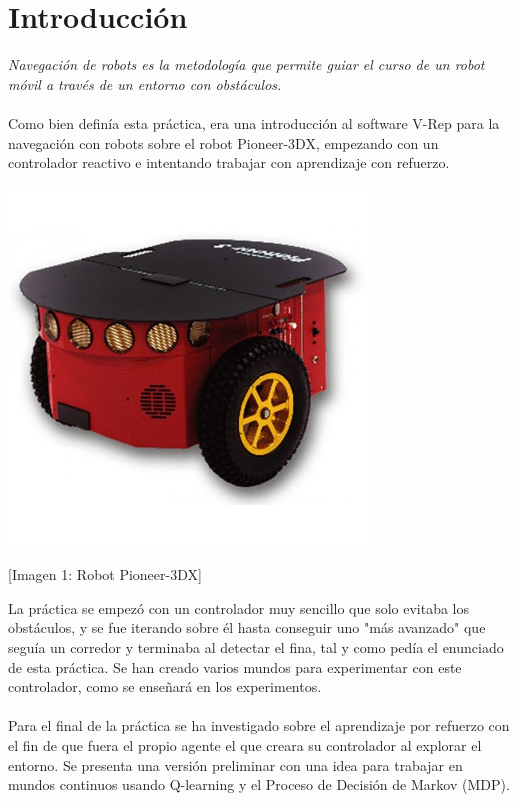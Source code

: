 \documentclass[14pt]{extarticle}
\theoremstyle{definition}
\theoremstyle{remark}
\begin{document}
\section{Introducción}\label{sec:introduccion}
\textit{Navegación de robots es la metodología que permite guiar el curso de un robot móvil a través de un entorno con obstáculos. }\cite{pdf:navegacion_de_robot}
\\\\Como bien definía esta práctica, era una introducción al software V-Rep para la navegación con robots sobre el robot Pioneer-3DX, empezando con un controlador reactivo e intentando trabajar con aprendizaje con refuerzo.\\
\begin{center}
	\includegraphics[scale=0.6]{pioneer.jpg}
\end{center}
\begin{center}
	[Imagen 1: Robot Pioneer-3DX]
\end{center}
La práctica se empezó con un controlador muy sencillo que solo evitaba los obstáculos, y se fue iterando sobre él hasta conseguir uno "más avanzado" que seguía un corredor y terminaba al detectar el fina, tal y como pedía el enunciado de esta práctica. Se han creado varios mundos para experimentar con este controlador, como se enseñará en los experimentos.\\\\
Para el final de la práctica se ha investigado sobre el aprendizaje por refuerzo con el fin de que fuera el propio agente el que creara su controlador al explorar el entorno. Se presenta una versión preliminar con una idea para trabajar en mundos continuos usando Q-learning y el Proceso de Decisión de Markov (MDP).
\end{document}

